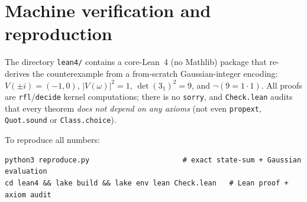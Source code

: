 \documentclass[11pt]{article}
\theoremstyle{definition}
\begin{document}
\section*{Machine verification and reproduction}

The directory \texttt{lean4/} contains a core-Lean~4 (no Mathlib) package
that re-derives the counterexample from a from-scratch Gaussian-integer
encoding: $V(\pm i) = (-1,0)$, $|V(\omega)|^2 = 1$, $\det(3_1)^2 = 9$, and
$\neg(9 = 1\cdot 1)$.  All proofs are \texttt{rfl}/\texttt{decide} kernel
computations; there is no \texttt{sorry}, and \texttt{Check.lean} audits
that every theorem \emph{does not depend on any axioms} (not even
\texttt{propext}, \texttt{Quot.sound} or \texttt{Class.choice}).

To reproduce all numbers:
\begin{verbatim}
python3 reproduce.py                      # exact state-sum + Gaussian evaluation
cd lean4 && lake build && lake env lean Check.lean   # Lean proof + axiom audit
\end{verbatim}
\end{document}
